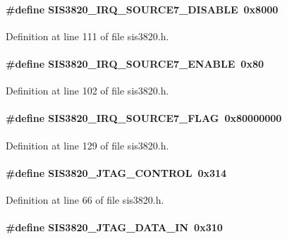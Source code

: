 \paragraph[{SIS3820\_\-IRQ\_\-SOURCE7\_\-DISABLE}]{\setlength{\rightskip}{0pt plus 5cm}\#define SIS3820\_\-IRQ\_\-SOURCE7\_\-DISABLE~0x8000}\hfill\label{sis3820_8h_ab4a0307e63112abc51e8be16a2f3ace3}


Definition at line 111 of file sis3820.h.
\paragraph[{SIS3820\_\-IRQ\_\-SOURCE7\_\-ENABLE}]{\setlength{\rightskip}{0pt plus 5cm}\#define SIS3820\_\-IRQ\_\-SOURCE7\_\-ENABLE~0x80}\hfill\label{sis3820_8h_a9845f829f6dd5654c18e600061635524}


Definition at line 102 of file sis3820.h.
\paragraph[{SIS3820\_\-IRQ\_\-SOURCE7\_\-FLAG}]{\setlength{\rightskip}{0pt plus 5cm}\#define SIS3820\_\-IRQ\_\-SOURCE7\_\-FLAG~0x80000000}\hfill\label{sis3820_8h_ac7b72928c545d85f3e4460ce8246fe3c}


Definition at line 129 of file sis3820.h.
\paragraph[{SIS3820\_\-JTAG\_\-CONTROL}]{\setlength{\rightskip}{0pt plus 5cm}\#define SIS3820\_\-JTAG\_\-CONTROL~0x314}\hfill\label{sis3820_8h_a333af086dcdd4ee7d0b0fc73297edc8e}


Definition at line 66 of file sis3820.h.
\paragraph[{SIS3820\_\-JTAG\_\-DATA\_\-IN}]{\setlength{\rightskip}{0pt plus 5cm}\#define SIS3820\_\-JTAG\_\-DATA\_\-IN~0x310}\hfill\label{sis3820_8h_a73c56ad223e51f9e925c2df8f362ed72}


